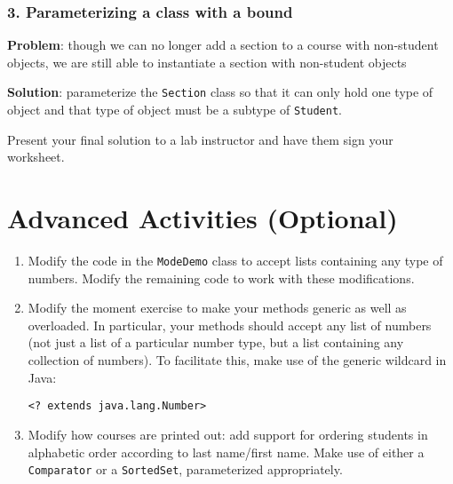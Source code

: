 \documentclass[12pt]{scrartcl}
\begin{document}
\subsubsection*{3. Parameterizing a class with a bound}

\textbf{Problem}: though we can no longer add a section to a course 
with non-student objects, we are still able to instantiate a section 
with non-student objects 

\textbf{Solution}: parameterize the \texttt{Section} class 
so that it can only hold one type of object and that type of object 
must be a subtype of \texttt{Student}.

Present your final solution to a lab instructor and have them sign
your worksheet.

\section*{Advanced Activities (Optional)}

\begin{enumerate}
  \item Modify the code in the \texttt{ModeDemo} class to 
  	accept lists containing any type of numbers.  Modify the remaining 
	code to work with these modifications.
  \item Modify the moment exercise to make your methods generic as 
    well as overloaded.  In particular, your methods should accept any 
    list of numbers (not just a list of a particular number type, but 
    a list containing any collection of numbers).  To facilitate this, 
    make use of the generic wildcard in Java: 
    
    \texttt{<? extends java.lang.Number>}
    
  \item Modify how courses are printed out: add support for ordering 
    students in alphabetic order according to last name/first name.  
    Make use of either a \texttt{Comparator} or a 
    \texttt{SortedSet}, parameterized appropriately.
\end{enumerate}
\end{document}

